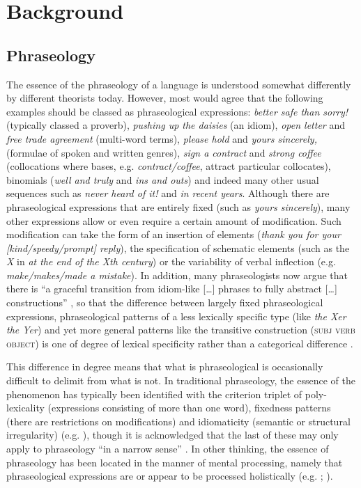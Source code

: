 \documentclass[output=paper]{langscibook}
\begin{document}
\section{Background}
\subsection{Phraseology}

The essence of the phraseology of a language is understood somewhat differently by different theorists today. However, most would agree that the following examples should be classed as phraseological expressions: \textit{better safe than sorry!} (typically classed a proverb), \textit{pushing up the daisies} (an idiom), \textit{open letter} and \textit{free trade agreement} (multi-word terms), \textit{please hold} and \textit{yours sincerely,} (formulae of spoken and written genres), \textit{sign a contract} and \textit{strong coffee} (collocations where bases, e.g. \textit{contract/coffee}, attract particular collocates), binomials (\textit{well and truly} and \textit{ins and outs}) and indeed many other usual sequences such as \textit{never heard of it!} and \textit{in recent years}. Although there are phraseological expressions that are entirely fixed (such as \textit{yours sincerely}), many other expressions allow or even require a certain amount of modification. Such modification can take the form of an insertion of elements (\textit{thank you for your [kind/speedy/prompt] reply}), the specification of schematic elements (such as the \textit{X} in \textit{at the end of the Xth century}) or the variability of verbal inflection (e.g. \textit{make/makes/made a mistake}). In addition, many phraseologists now argue that there is ``a graceful transition from idiom-like […] phrases to fully abstract […] constructions'' \citep[137]{Dominey2006}, so that the difference between largely fixed phraseological expressions, phraseological patterns of a less lexically specific type (like \textit{the Xer the Yer}) and yet more general patterns like the transitive construction (\textsc{subj verb object}) is one of degree of lexical specificity rather than a categorical difference \citep{Buerki2016}.

This difference in degree means that what is phraseological is occasionally difficult to delimit from what is not. In traditional phraseology, the essence of the phenomenon has typically been identified with the criterion triplet of poly-lexicality (expressions consisting of more than one word), fixedness patterns (there are restrictions on modifications) and idiomaticity (semantic or structural irregularity) (e.g. \citealt{BurgerEtAl1982,BurgerEtAl2007}), though it is acknowledged that the last of these may only apply to phraseology ``in a narrow sense'' \citep[11]{BurgerEtAl2007}. In other thinking, the essence of phraseology has been located in the manner of mental processing, namely that phraseological expressions are or appear to be processed holistically (e.g. \citealt[110]{Sinclair1991}; \citealt[9]{Wray2002}).
\end{document}
